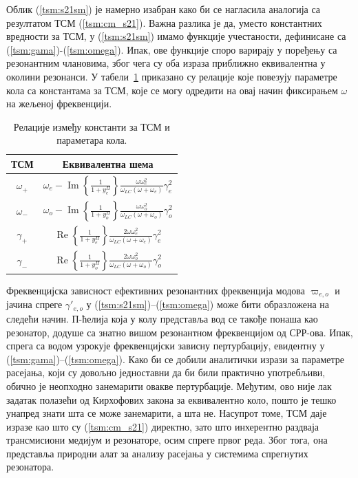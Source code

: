 Облик (\ref{tsm:s21sm}) је намерно изабран како би се нагласила аналогија са резултатом ТСМ (\ref{tsm:cm_s21}). Важна разлика је да, уместо константних вредности за ТСМ, у (\ref{tsm:s21sm}) имамо функције учестаности, дефинисане са (\ref{tsm:gama})-(\ref{tsm:omega}). Ипак, ове функције споро варирају у поређењу са резонантним члановима, због чега су оба израза приближно еквивалентна у околини резонанси. У табели~\ref{tsm:tabela_ekv} приказано су релације које повезују параметре кола са константама за ТСМ, које се могу одредити на овај начин фиксирањем $\omega$ на жељеној фреквенцији.
\begin{table}[!t]
\renewcommand{\arraystretch}{2.8}
\caption{Релације између константи за ТСМ и параметара кола.}
\label{tsm:tabela_ekv}
\centering
\begin{tabular}{|c|c|}
\hline
ТСМ & Еквивалентна шема \\
\hline
$\omega_+$ & $\omega_{e} - \operatorname{Im}\left\{ \frac{1}{1+y_{e}^\Pi} \right\} \frac{\omega\omega_{e}^2}{\omega_{LC}(\omega + \omega_e)}\gamma_{e}^2$ \\
\hline
$\omega_-$ & $\omega_{o} - \operatorname{Im}\left\{ \frac{1}{1+y_{o}^\Pi} \right\} \frac{\omega\omega_{o}^2}{\omega_{LC}(\omega + \omega_o)}\gamma_{o}^2$ \\
\hline
$\gamma_+$ & $\operatorname{Re}\left\{ \frac{1}{1+y_{e}^\Pi} \right\} \frac{2\omega\omega_{e}^2}{\omega_{LC}(\omega + \omega_e)}\gamma_{e}^2$ \\
\hline
$\gamma_-$ & $\operatorname{Re}\left\{ \frac{1}{1+y_{o}^\Pi} \right\} \frac{2\omega\omega_{o}^2}{\omega_{LC}(\omega + \omega_o)}\gamma_{o}^2$\\
\hline
\end{tabular}
\end{table}

Фреквенцијска зависност ефективних резонантних фреквенција модова $\varpi_{e,o}$ и јачина спреге $\gamma'_{e,o}$ у (\ref{tsm:s21sm})--(\ref{tsm:omega}) може бити образложена на следећи начин. П-ћелија која у колу представља вод се такође понаша као резонатор, додуше са знатно вишом резонантном фреквенцијом од СРР-ова. Ипак, спрега са водом узрокује фреквенцијски зависну пертурбацију, евидентну у (\ref{tsm:gama})--(\ref{tsm:omega}). Како би се добили аналитички изрази за параметре расејања, који су довољно једноставни да би били практично употребљиви, обично је неопходно занемарити овакве пертурбације. Међутим, ово није лак задатак полазећи од Кирхофових закона за еквивалентно коло, пошто је тешко унапред знати шта се може занемарити, а шта не. Насупрот томе, ТСМ даје изразе као што су (\ref{tsm:cm_s21}) директно, зато што инхерентно раздваја трансмисиони медијум и резонаторе, осим спреге првог реда. Због тога, она представља природни алат за анализу расејања у системима спрегнутих резонатора.

